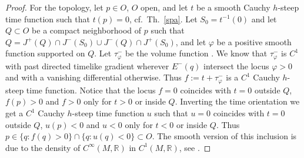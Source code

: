 \documentclass[a4paper]{jpconf}
\theoremstyle{definition}
\theoremstyle{remark}
\begin{document}
\begin{proof}
For the topology, let $p\in O$, $O$ open, and let $t$ be a  smooth Cauchy $h$-steep time function such that $t(p)=0$, cf.\ Th.\ \ref{spa}. Let $S_0=t^{-1}(0)$ and let $Q\subset O$ be a compact neighborhood of $p$ such that $Q=J^+(Q)\cap J^{-}(S_0)\cup J^-(Q)\cap J^{+}(S_0)$, and let $\varphi$ be a positive smooth function  supported on $Q$.  Let $\tau^{-}_\varphi$ be the  volume function \cite{chrusciel13}. We know that $\tau^{-}_\varphi$ is $C^1$ with past directed timelike gradient  wherever $E^{-}(q)$ intersect the locus $\varphi>0$ and with a vanishing differential otherwise.
Thus $f:=t+ \tau^{-}_\varphi$ is a $C^1$   Cauchy $h$-steep time function. Notice that the locus $f=0$ coincides with $t=0$ outside $Q$, $f(p)>0$ and $f>0$ only for $t>0$ or inside $Q$. Inverting the time orientation we get a  $C^1$   Cauchy $h$-steep time function $u$ such that $u=0$ coincides with  $t=0$ outside $Q$, $u(p)<0$ and $ u<0$ only for $t<0$ or inside $Q$. Thus $p\in \{q\colon f(q)>0\}\cap \{q\colon u(q)<0\}\subset O$. The smooth version of this inclusion is due to the density of $C^\infty(M,\mathbb{R})$  in
$C^1(M,\mathbb{R})$, see \cite[Th.\ 2.6]{hirsch76}.
\end{proof}
\end{document}
